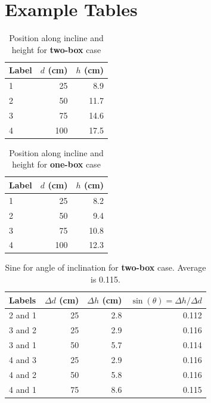 \section{Example Tables}
%
\begin{table}[ht]
    \centering
    \begin{tabular}{l|r|r}
        \textbf{Label} & $d$ (cm) & $h$ (cm) \\
        \hline
        1 & 25 & 8.9 \\
        2 & 50 & 11.7 \\
        3 & 75 & 14.6 \\
        4 & 100 & 17.5 \\
        \hline
    \end{tabular}
    \caption{Position along incline and height for \textbf{two-box} case}
    \label{table:02.height.2}
\end{table}
%
\begin{table}[ht]
    \centering
    \begin{tabular}{l|r|r}
        \textbf{Label} & $d$ (cm) & $h$ (cm) \\
        \hline
        1 & 25 & 8.2 \\
        2 & 50 & 9.4 \\
        3 & 75 & 10.8 \\
        4 & 100 & 12.3 \\
        \hline
    \end{tabular}
    \caption{Position along incline and height for \textbf{one-box} case}
    \label{table:02.height.1}
\end{table}
%
\begin{table}[ht]
    \centering
    \begin{tabular}{l|r|r|r}
        \textbf{Labels} & $\Delta d$ (cm) & $\Delta h$ (cm) & $\sin(\theta) = \Delta h / \Delta d$ \\
        \hline
        2 and 1 & 25 & 2.8 & 0.112 \\
        3 and 2 & 25 & 2.9 & 0.116 \\
        3 and 1 & 50 & 5.7 & 0.114 \\
        4 and 3 & 25 & 2.9 & 0.116 \\
        4 and 2 & 50 & 5.8 & 0.116 \\
        4 and 1 & 75 & 8.6 & 0.115 \\
        \hline
    \end{tabular}
    \caption{Sine for angle of inclination for \textbf{two-box} case. Average is 0.115.}
    \label{table:02.sine.2}
\end{table}
